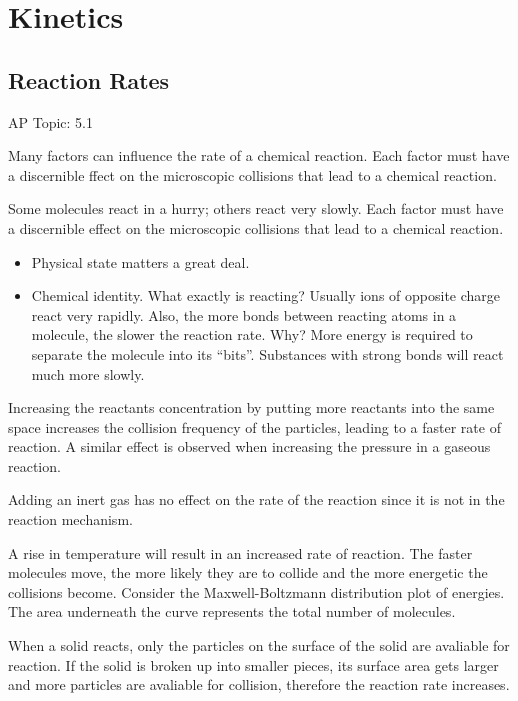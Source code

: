 \documentclass[../chem.tex]{subfiles}
\begin{document}
\chapter{Kinetics}
\section{Reaction Rates}
AP Topic: 5.1

Many factors can influence the rate of a chemical reaction. Each factor must have a discernible ffect on the microscopic collisions that lead to a chemical reaction.

Some molecules react in a hurry; others react very slowly. Each factor must have a discernible effect on the microscopic collisions that lead to a chemical reaction.

\begin{itemize}
    \item Physical state matters a great deal.
    \item Chemical identity. What exactly is reacting? Usually ions of opposite charge react very rapidly. Also, the more bonds between reacting atoms in a molecule, 
    the slower the reaction rate. Why? More energy is required to separate the molecule into its ``bits''. Substances with strong bonds will react much more slowly. 
\end{itemize}

Increasing the reactants concentration by putting more reactants into the same space increases the collision frequency of the particles, leading to
a faster rate of reaction. A similar effect is observed when increasing the pressure in a gaseous reaction.

Adding an inert gas has no effect on the rate of the reaction since it is not in the reaction mechanism. 

A rise in temperature will result in an increased rate of reaction. The faster molecules move, the more likely they are to collide and the 
more energetic the collisions become. Consider the Maxwell-Boltzmann distribution plot of energies. The area underneath the curve represents the total number of molecules.

When a solid reacts, only the particles on the surface of the solid are avaliable for reaction. If the solid is broken up into smaller pieces, its surface area 
gets larger and more particles are avaliable for collision, therefore the reaction rate increases. 
\end{document}
